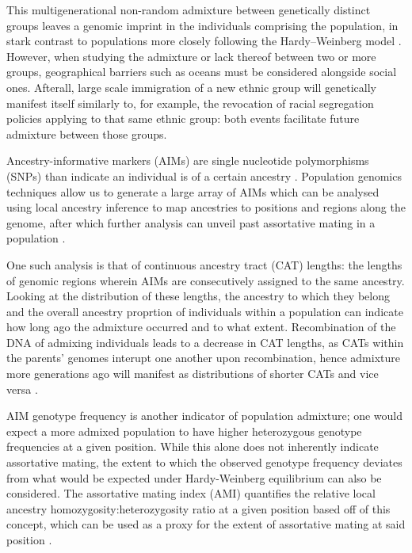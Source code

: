 \documentclass[11pt]{article}
\begin{document}
This multigenerational non-random admixture between genetically distinct groups leaves a genomic imprint in the individuals comprising the population, in stark contrast to populations more closely following the Hardy–Weinberg model \parencite{Zaitlen2017}. However, when studying the admixture or lack thereof between two or more groups, geographical barriers such as oceans must be considered alongside social ones. Afterall, large scale immigration of a new ethnic group will genetically manifest itself similarly to, for example, the revocation of racial segregation policies applying to that same ethnic group: both events facilitate future admixture between those groups.

Ancestry-informative markers (AIMs) are single nucleotide polymorphisms (SNPs) than indicate an individual is of a certain ancestry \parencite{Risch2009}. Population genomics techniques allow us to generate a large array of AIMs which can be analysed using local ancestry inference to map ancestries to positions and regions along the genome, after which further analysis can unveil past assortative mating in a population \parencite{Schubert2020}.

One such analysis is that of continuous ancestry tract (CAT) lengths: the lengths of genomic regions wherein AIMs are consecutively assigned to the same ancestry. Looking at the distribution of these lengths, the ancestry to which they belong and the overall ancestry proprtion of individuals within a population can indicate how long ago the admixture occurred and to what extent. Recombination of the DNA of admixing individuals leads to a decrease in CAT lengths, as CATs within the parents' genomes interupt one another upon recombination, hence admixture more generations ago will manifest as distributions of shorter CATs and vice versa \parencite{Gravel2012}. 

AIM genotype frequency is another indicator of population admixture; one would expect a more admixed population to have higher heterozygous genotype frequencies at a given position. While this alone does not inherently indicate assortative mating, the extent to which the observed genotype frequency deviates from what would be expected under Hardy-Weinberg equilibrium can also be considered. The assortative mating index (AMI) quantifies the relative local ancestry homozygosity:heterozygosity ratio at a given position based off of this concept, which can be used as a proxy for the extent of assortative mating at said position \parencite{Norris2019}.
\end{document}
